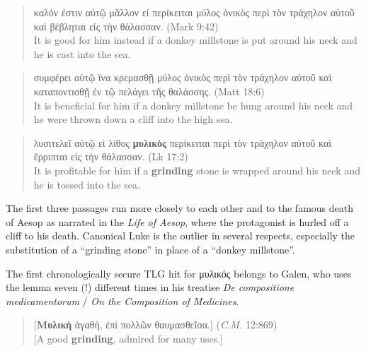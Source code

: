  \begin{quote} καλόν ἐστιν αὐτῷ μᾶλλον εἰ περίκειται μύλος ὀνικὸς περὶ τὸν %
 τράχηλον αὐτοῦ καὶ βέβληται εἰς τὴν θάλασσαν. (Mark 9:42) \\[1mm] %
 It is good for him instead if a donkey millstone is put around %
 his neck and he is cast into the sea. \end{quote} %
 \vspace*{1mm}

 \begin{quote} %
 συμφέρει αὐτῷ ἵνα κρεμασθῇ μύλος ὀνικὸς περὶ τὸν %
τράχηλον αὐτοῦ καὶ καταποντισθῇ ἐν τῷ πελάγει τῆς θαλάσσης. (Matt 18:6) \\[1mm] %
It is beneficial for him if a donkey millstone be hung around his neck %
and he were thrown down a cliff into the high sea. %
\end{quote} %
\vspace*{1mm}

 \begin{quote}λυσιτελεῖ αὐτῷ εἰ λίθος \textbf{μυλικὸς} περίκειται περὶ τὸν τράχηλον αὐτοῦ %
 καὶ ἔρριπται εἰς τὴν θάλασσαν. (Lk 17:2) \\[1mm] %
 It is profitable for him if a \textbf{grinding} stone is wrapped around his neck %
 and he is tossed into the sea. \end{quote} %
\vspace*{2mm}

\noindent{}The first three passages run more closely to each other %
and to the famous death of Aesop %
as narrated in the \textit{Life of Aesop}, where the %
protagonist is hurled off a cliff to his death. %
Canonical Luke is the outlier in several respects, %
especially the substitution of a “grinding stone” in place of a “donkey millstone”. %

The first chronologically secure TLG hit for μυλικός %
belongs to Galen, who uses the lemma seven (!) different times %
in his treatise \textit{De compositione medicamentorum} / %
\textit{On the Composition of Medicines}. %

\vspace*{3mm}
\begin{quote}
[\textbf{Μυλικὴ} ἀγαθὴ, ἐπὶ πολλῶν θαυμασθεῖσα.] (\textit{C.M.} 12:869) \\[0.5mm] %
[A good \textbf{grinding}, admired for many uses.]
\end{quote} %
\vspace*{1mm}

